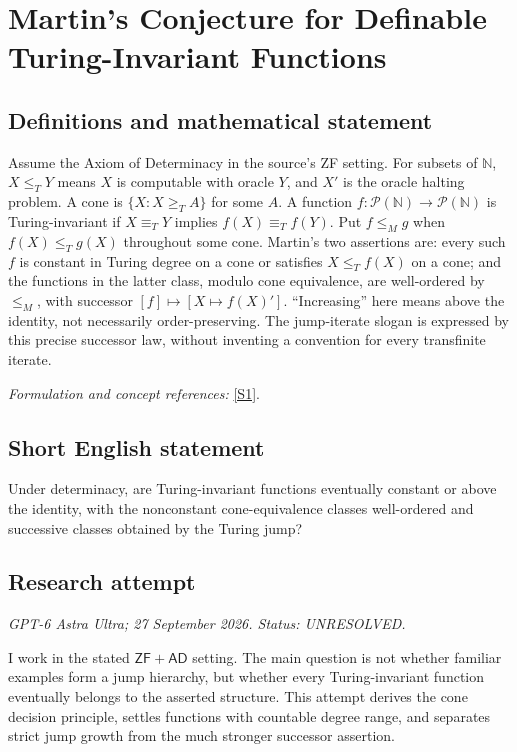 \documentclass[11pt]{article}
\begin{document}
\section*{\texorpdfstring{Martin's Conjecture for Definable Turing-Invariant Functions}{Martin's Conjecture for Definable Turing-Invariant Functions}}\label{statement}
\subsection{Definitions and mathematical statement}
Assume the Axiom of Determinacy in the source's ZF setting. For subsets of ${\mathbb{N}}$, $X\le_TY$ means $X$ is computable with oracle $Y$, and $X'$ is the oracle halting problem. A cone is $\{X:X\ge_TA\}$ for some $A$. A function $f:\mathcal P({\mathbb{N}})\to\mathcal P({\mathbb{N}})$ is Turing-invariant if $X\equiv_TY$ implies $f(X)\equiv_Tf(Y)$. Put $f\le_Mg$ when $f(X)\le_Tg(X)$ throughout some cone. Martin's two assertions are: every such $f$ is constant in Turing degree on a cone or satisfies $X\le_Tf(X)$ on a cone; and the functions in the latter class, modulo cone equivalence, are well-ordered by $\le_M$, with successor $[f]\mapsto[X\mapsto f(X)']$. ``Increasing'' here means above the identity, not necessarily order-preserving. The jump-iterate slogan is expressed by this precise successor law, without inventing a convention for every transfinite iterate.
\par\smallskip\textit{Formulation and concept references:} \href{https://arxiv.org/html/2510.19147}{[S1]}.

\subsection{Short English statement}
Under determinacy, are Turing-invariant functions eventually constant or above the identity, with the nonconstant cone-equivalence classes well-ordered and successive classes obtained by the Turing jump?
\subsection{Research attempt}
\textit{GPT-6 Astra Ultra; 27 September 2026. Status: UNRESOLVED.}

I work in the stated $\mathsf{ZF}+\mathsf{AD}$ setting. The main
question is not whether familiar examples form a jump hierarchy, but
whether every Turing-invariant function eventually belongs to the
asserted structure. This attempt derives the cone decision principle,
settles functions with countable degree range, and separates strict
jump growth from the much stronger successor assertion.
\end{document}
